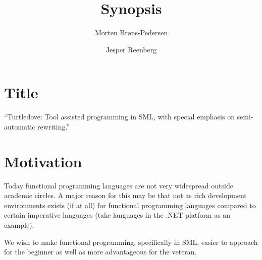 \documentclass[a4paper,oneside]{article}
\author{Morten Brøns-Pedersen \and Jesper Reenberg}
\title{Synopsis}
\begin{document}
\maketitle






\section{Title}
``Turtledove: Tool assisted programming in SML, with special emphasis on semi-automatic
rewriting.''

\section{Motivation}
Today functional programming languages are not very widespread outside academic circles. A major
reason for this may be that not as rich development environments exists (if at all) for functional
programming languages compared to certain imperative languages (take languages in the .NET platform
as an example).

We wish to make functional programming, specifically in SML, easier to approach for the beginner as
well as more advantageous for the veteran.
\end{document}
